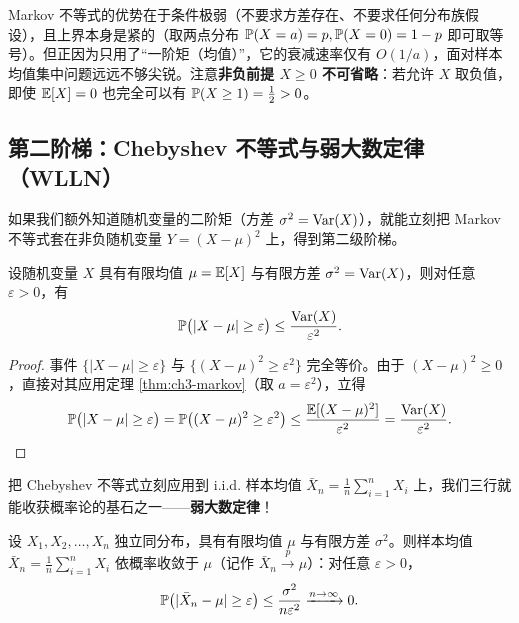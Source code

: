 Markov 不等式的优势在于条件极弱（不要求方差存在、不要求任何分布族假设），且上界本身是紧的（取两点分布 $\mathbb{P}(X=a)=p, \mathbb{P}(X=0)=1-p$ 即可取等号）。但正因为只用了“一阶矩（均值）”，它的衰减速率仅有 $O(1/a)$，面对样本均值集中问题远远不够尖锐。注意\textbf{非负前提 $X \ge 0$ 不可省略}：若允许 $X$ 取负值，即使 $\mathbb{E}[X] = 0$ 也完全可以有 $\mathbb{P}(X \ge 1) = \tfrac{1}{2} > 0$。

\subsection{第二阶梯：Chebyshev 不等式与弱大数定律（WLLN）}

如果我们额外知道随机变量的二阶矩（方差 $\sigma^2 = \operatorname{Var}(X)$），就能立刻把 Markov 不等式套在非负随机变量 $Y = (X - \mu)^2$ 上，得到第二级阶梯。

\begin{thmBox}
\begin{theorem}
\label{thm:ch3-chebyshev}
设随机变量 $X$ 具有有限均值 $\mu = \mathbb{E}[X]$ 与有限方差 $\sigma^2 = \operatorname{Var}(X)$，则对任意 $\varepsilon > 0$，有
\begin{equation}
  \mathbb{P}\bigl(|X - \mu| \ge \varepsilon\bigr) \le \frac{\operatorname{Var}(X)}{\varepsilon^2}. \label{eq:ch3-chebyshev}
\end{equation}
\end{theorem}
\end{thmBox}

\begin{proof}
事件 $\{|X - \mu| \ge \varepsilon\}$ 与 $\{(X - \mu)^2 \ge \varepsilon^2\}$ 完全等价。由于 $(X - \mu)^2 \ge 0$，直接对其应用定理 \ref{thm:ch3-markov}（取 $a = \varepsilon^2$），立得
\[
  \mathbb{P}\bigl(|X - \mu| \ge \varepsilon\bigr)
  = \mathbb{P}\bigl((X - \mu)^2 \ge \varepsilon^2\bigr)
  \le \frac{\mathbb{E}[(X - \mu)^2]}{\varepsilon^2}
  = \frac{\operatorname{Var}(X)}{\varepsilon^2}.
\]
\end{proof}

把 Chebyshev 不等式立刻应用到 i.i.d. 样本均值 $\bar{X}_n = \frac{1}{n}\sum_{i=1}^n X_i$ 上，我们三行就能收获概率论的基石之一——\textbf{弱大数定律}！

\begin{thmBox}
\begin{theorem}
\label{thm:ch3-wlln}
设 $X_1, X_2, \dots, X_n$ 独立同分布，具有有限均值 $\mu$ 与有限方差 $\sigma^2$。则样本均值 $\bar{X}_n = \frac{1}{n}\sum_{i=1}^n X_i$ 依概率收敛于 $\mu$（记作 $\bar{X}_n \xrightarrow{p} \mu$）：对任意 $\varepsilon > 0$，
\begin{equation}
  \mathbb{P}\bigl(|\bar{X}_n - \mu| \ge \varepsilon\bigr) \le \frac{\sigma^2}{n \varepsilon^2} \xrightarrow{n \to \infty} 0. \label{eq:ch3-wlln}
\end{equation}
\end{theorem}
\end{thmBox}

